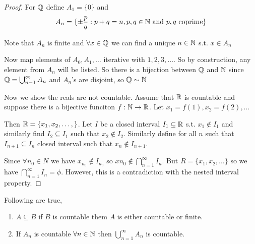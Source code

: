 \begin{proof}
    For $\mathbb{Q}$ define  $A_1 = \{0\}$ and $$A_n = \{\pm \frac{p}{q}: p + q = n, p, q \in \mathbb{N} \text{ and } p,q \text{ coprime}\}$$


    Note that $A_n$ is finite and $\forall x \in \mathbb{Q}$ we can find a unique  $n \in \mathbb{N}$ s.t. $x \in A_n$

    Now map elements of $A_0, A_1, \dots$ iterative with $1, 2, 3, \dots$. So by construction, any element from $A_n$ will be listed. So there is a bijection between $\mathbb{Q}$ and  $\mathbb{N}$ since  $\mathbb{Q} = \bigcup_{n - 1}^{\infty} A_n$ and $A_n$'s are disjoint, so  $\mathbb{Q} \sim \mathbb{N}$


    Now we show the reals are not countable. Assume that $\mathbb{R}$ is countable and suppose there is a bijective funciton $f: \mathbb{N} \to \mathbb{R}$. Let  $x_1 = f(1), x_2= f(2), \dots$

    Then $\mathbb{R} = \{x_1, x_2, \dots,\} $. Let $I$ be a closed interval  $I_1 \subseteq \mathbb{R}$ s.t. $x_1 \not \in I_1$ and similarly find $I_2 \subseteq I_1$ such that $x_2 \not \in I_2$. Similarly define for all $n$ such that  $I_{n + 1} \subseteq I_n$ closed interval such that  $x_n \not \in I_{n + 1}$. 

    Since $\forall n_0 \in N$ we have $x_{n_0} \not \in I_{n_0}$ so $xn_0 \not \in \bigcap_{n = 1}^{\infty} I_n$. But $R = \{x_1,x_2,  \dots\}$ so we have $\bigcap_{n = 1}^{\infty} I_n = \phi$. However, this is a contradiction with the nested interval property.
\end{proof}


\begin{theorem}
    Following are true,
    \begin{enumerate}
        \item $A \subseteq B$ if $B$ is countable them $A$ is either countable or finite. 
        \item If $A_n$ is countable $\forall n \in \mathbb{N}$ then $\bigcup_{n = 1}^{\infty} A_n$ is countable.
    \end{enumerate}
\end{theorem}
